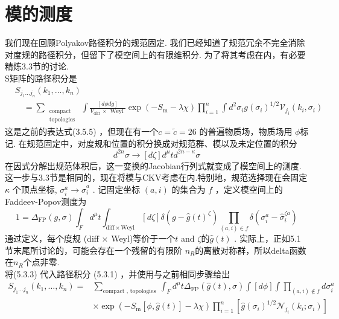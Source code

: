 \section{模的测度}%
我们现在回顾Polyakov路径积分的规范固定.  我们已经知道了规范冗余不完全消除对度规的路径积分，但留下了模空间上的有限维积分. 为了将其考虑在内，有必要精炼3.3节的讨论.\\
S矩阵的路径积分是
\begin{equation}
	\begin{aligned}
		&S_{j_{1} \ldots j_{n}}\left(k_{1}, \ldots, k_{n}\right) \\
		&\quad=\sum_{\begin{array}{l}
				\text { compact } \\
				\text { topologies }
		\end{array}} \int \frac{[d \phi d g]}{V_{\text {diff }} \times \text { Weyl }} \exp \left(-S_{\mathrm{m}}-\lambda \chi\right) \prod_{i=1}^{n} \int d^{2} \sigma_{i} g\left(\sigma_{i}\right)^{1 / 2} \mathscr{V}_{j_{i}}\left(k_{i}, \sigma_{i}\right)
	\end{aligned}
\end{equation}
这是之前的表达式(3.5.5) ，但现在有一个$c=\tilde{c}=26$ 的普遍物质场，物质场用 $\phi $标记. 在规范固定中，对度规和位置的积分换成对规范群、模以及未定位置的积分
\begin{equation}
	[d g] d^{2 n} \sigma \rightarrow[d \zeta] d^{\mu} t d^{2 n-\kappa} \sigma
\end{equation}
在因式分解出规范体积后，这一变换的Jacobian行列式就变成了模空间上的测度.\\
这一步与3.3节是相同的，现在将模与CKV考虑在内.特别地，规范选择现在会固定 $\kappa$ 个顶点坐标, $\sigma_{i}^{a} \rightarrow \hat{\sigma}_{i}^{a} $ . 记固定坐标 $(a, i)$ 的集合为 $f $ ，定义模空间上的Faddeev-Popov测度为
\begin{equation}
	1=\Delta_{\mathrm{FP}}(g, \sigma) \int_{F} d^{\mu} t \int_{\mathrm{diff} \times \mathrm{Weyl}}[d \zeta] \delta\left(g-\hat{g}(t)^{\zeta}\right) \prod_{(a, i) \in f} \delta\left(\sigma_{i}^{a}-\hat{\sigma}_{i}^{\zeta a}\right)
\end{equation}
通过定义，每个度规 (diff $\times$ Weyl)等价于一个$t$ and $\zeta $的$\hat{g}(t)$ . 实际上，正如5.1节末尾所讨论的，可能会存在一个残留的有限阶 $n_{R}$的离散对称群，所以delta函数在$n_{R}$个点非零.\\
将(5.3.3) 代入路径积分 (5.3.1) ，并使用与之前相同步骤给出
\begin{equation}
	\begin{aligned}
		S_{j_{1} \ldots j_{n}}\left(k_{1}, \ldots, k_{n}\right)=& \sum_{\text {compact },\text { topologies } } \int_{F} d^{\mu} t \Delta_{\mathrm{FP}}(\hat{g}(t), \hat{\sigma}) \int[d \phi] \int \prod_{(a, i) \notin f} d \sigma_{i}^{a} \\	
		&\times \exp \left(-S_{\mathrm{m}}[\phi, \hat{g}(t)]-\lambda \chi\right) \prod_{i=1}^{n}\left[\hat{g}\left(\sigma_{i}\right)^{1 / 2} \mathscr{N}_{j_{i}}\left(k_{i} ; \sigma_{i}\right)\right]
	\end{aligned}
\end{equation}
